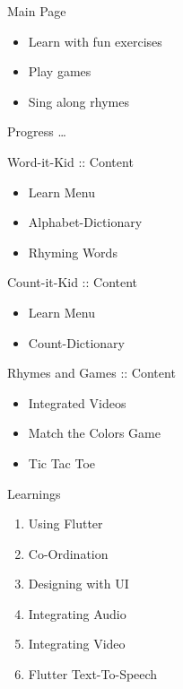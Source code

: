 \documentclass[14pt]{beamer}
\begin{document}
\begin{frame}{Main Page}
    \begin{itemize}
            \pause
        \item Learn with fun exercises \\
            \pause
        \item Play games \\
            \pause
        \item Sing along rhymes
    \end{itemize}
\end{frame}

\begin{frame}[standout]
    \alert{Progress \ldots}
\end{frame}

\begin{frame}{Word-it-Kid :: Content}
    \begin{itemize}
            \pause
	\item Learn Menu
	    \pause
        \item Alphabet-Dictionary
            \pause
	\item Rhyming Words
    \end{itemize}
\end{frame}

\begin{frame}{Count-it-Kid :: Content}
    \begin{itemize}
            \pause
        \item Learn Menu
            \pause
        \item Count-Dictionary
    \end{itemize}
\end{frame}

\begin{frame}{Rhymes and Games :: Content}
    \begin{itemize}
            \pause
        \item Integrated Videos
            \pause
        \item Match the Colors Game
	    \pause
	\item Tic Tac Toe
    \end{itemize}
\end{frame}

\begin{frame}{Learnings}
    \begin{enumerate}
        \item Using Flutter
        \item Co-Ordination
        \item Designing with UI
	\item Integrating Audio
	\item Integrating Video
	\item Flutter Text-To-Speech
    \end{enumerate}
\end{frame}
\end{document}
